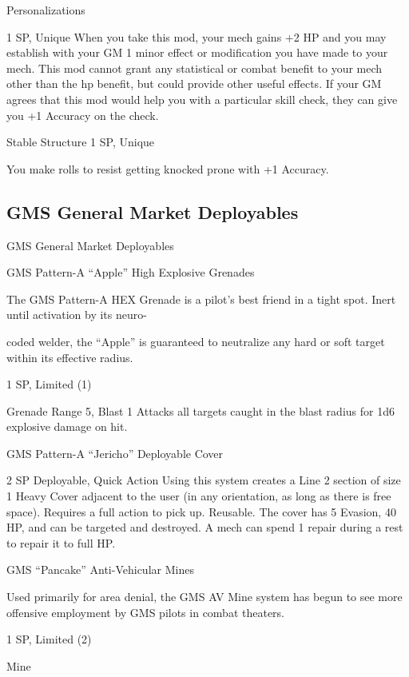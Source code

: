 Personalizations  

1 SP, Unique  
When you take this mod, your mech gains +2 HP and you may establish with your GM 1 minor  
effect or modification you have made to your mech. This mod cannot grant any statistical or  
combat benefit to your mech other than the hp benefit, but could provide other useful effects. If  
your GM agrees that this mod would help you with a particular skill check, they can give you +1  
Accuracy on the check.
 

Stable Structure  
1 SP, Unique  

You make rolls to resist getting knocked prone with +1 Accuracy.
 
\subsection{GMS General Market Deployables}
                               GMS General Market Deployables   

GMS Pattern-A “Apple” High Explosive Grenades  

The GMS Pattern-A HEX Grenade is a pilot’s best friend in a tight spot. Inert until activation by its neuro- 

coded welder, the “Apple” is guaranteed to neutralize any hard or soft target within its effective radius.  
 

1 SP, Limited (1)  

Grenade  
Range 5, Blast 1  
Attacks all targets caught in the blast radius for 1d6 explosive damage on hit.
 

GMS Pattern-A “Jericho”  Deployable Cover  

2 SP  
Deployable, Quick Action  
Using this system creates a Line 2 section of size 1 Heavy Cover adjacent to the user (in any  
orientation, as long as there is free space). Requires a full action to pick up. Reusable. The cover  
has 5 Evasion, 40 HP, and can be targeted and destroyed. A mech can spend 1 repair during a  
rest to repair it to full HP.
 

GMS “Pancake” Anti-Vehicular Mines  

                                                                                                                  


Used primarily for area denial, the GMS AV Mine system has begun to see more offensive employment by  
GMS pilots in combat theaters.   

1 SP, Limited (2)
 
Mine
 
